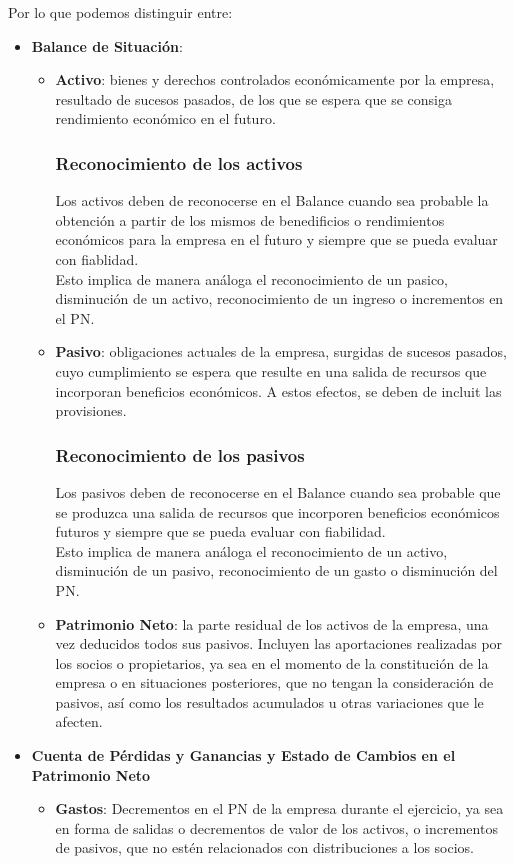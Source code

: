 \documentclass[a4paper,12pt]{article}
\begin{document}
Por lo que podemos distinguir entre:
\begin{itemize}
    \item \textbf{Balance de Situación}:
    \begin{itemize}
        \item \textbf{Activo}: bienes y derechos controlados económicamente por la empresa, resultado de sucesos pasados, de los que se espera que se consiga rendimiento económico en el futuro.
        
        \subsubsection*{Reconocimiento de los activos}
        Los activos deben de reconocerse en el Balance cuando sea probable la obtención a partir de los mismos de benedificios o rendimientos económicos para la empresa en el futuro y siempre que se pueda evaluar con fiablidad.\\
        Esto implica de manera análoga el reconocimiento de un pasico, disminución de un activo, reconocimiento de un ingreso o incrementos en el PN.

        \item \textbf{Pasivo}: obligaciones actuales de la empresa, surgidas de sucesos pasados, cuyo cumplimiento se espera que resulte en una salida de recursos que incorporan beneficios económicos. A estos efectos, se deben de incluit las provisiones.
        
        \subsubsection*{Reconocimiento de los pasivos}

        Los pasivos deben de reconocerse en el Balance cuando sea probable que se produzca una salida de recursos que incorporen beneficios económicos futuros y siempre que se pueda evaluar con fiabilidad.\\ 
        Esto implica de manera análoga el reconocimiento de un activo, disminución de un pasivo, reconocimiento de un gasto o disminución del PN.

        \item \textbf{Patrimonio Neto}: la parte residual de los activos de la empresa, una vez deducidos todos sus pasivos. Incluyen las aportaciones realizadas por los socios o propietarios, ya sea en el momento de la constitución de la empresa o en situaciones posteriores, que no tengan la consideración de pasivos, así como los resultados acumulados u otras variaciones que le afecten.
    \end{itemize}
    \item \textbf{Cuenta de Pérdidas y Ganancias y Estado de Cambios en el Patrimonio Neto}
    \begin{itemize}
        \item \textbf{Gastos}: Decrementos en el PN de la empresa durante el ejercicio, ya sea en forma de salidas o decrementos de valor de los activos, o incrementos de pasivos, que no estén relacionados con distribuciones a los socios. 
        

\end{itemize}
\end{itemize}
\end{document}
